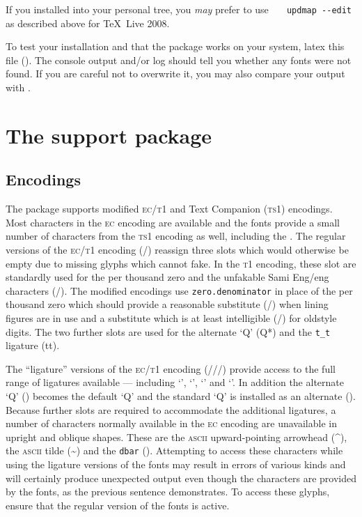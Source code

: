 \documentclass[11pt,british]{article}
\begin{document}
If you installed into your personal tree, you \emph{may} prefer to use \verb|	updmap --edit| as described above for \TeX~Live 2008.

To test your installation and that the package works on your system, latex this file (). The console output and/or log should tell you whether any fonts were not found. If you are careful not to overwrite it, you may also compare your output with .

\section{The support package}\label{sec:support}

\subsection{Encodings}\label{sec:encs}

The package supports modified \textsc{ec}/\textsc{t1} and Text Companion (\textsc{ts1}) encodings. Most characters in the \textsc{ec} encoding are available and the fonts provide a small number of characters from the \textsc{ts1} encoding as well, including the \texteuro. The regular versions of the \textsc{ec}/\textsc{t1} encoding (/) reassign three slots which would otherwise be empty due to missing glyphs which  cannot fake. In the \textsc{t1} encoding, these slot are standardly used for the per thousand zero and the unfakable Sami Eng/eng characters (\textorigrm{\NG}/\textorigrm{\ng}). The modified encodings use \verb|zero.denominator| in place of the per thousand zero which should provide a reasonable substitute (\textl{\textperthousand}/\textl{\textpertenthousand}) when lining figures are in use and a substitute which is at least intelligible (\textperthousand/\textpertenthousand) for oldstyle digits. The two further slots are used for the alternate `Q' (Q*) and the \verb|t_t| ligature (tt).

The ``ligature'' versions of the \textsc{ec}/\textsc{t1} encoding (///) provide access to the full range of ligatures available --- including `', `', `' and `'. In addition the alternate `Q' () becomes the default `Q' and the standard `Q' is installed as an alternate (). Because further slots are required to accommodate the additional ligatures, a number of characters normally available in the \textsc{ec} encoding are unavailable in upright and oblique shapes. These are the \textsc{ascii} upward-pointing arrowhead (\textasciicircum), the \textsc{ascii} tilde (\textasciitilde) and the \verb|dbar| (\dj).  Attempting to access these characters while using the ligature versions of the fonts may result in errors of various kinds and will certainly produce unexpected output even though the characters are provided by the fonts, as the previous sentence demonstrates. To access these glyphs, ensure that the regular version of the fonts is active.
\end{document}
